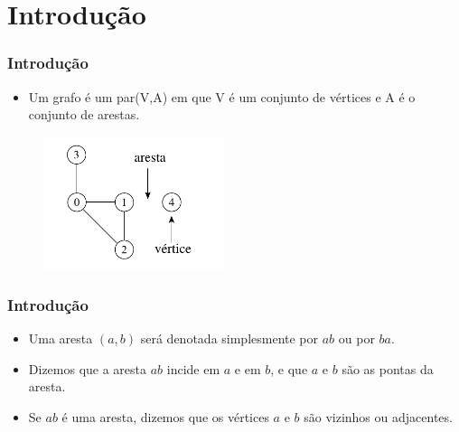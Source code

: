 \documentclass[aspectratio=169]{beamer}
\begin{document}
\section{Introdução} %

\begin{frame}
\frametitle{Introdução}
\begin{itemize}
\item Um grafo é um par(V,A) em que V é um conjunto de vértices e A é o conjunto de arestas.  
\end{itemize}
\begin{figure}[!h]
  \centering
  \includegraphics[width=150pt]{imagens/exemplo_grafo.png}
  \label{fig_exemplo_grafo1}
\end{figure}
\end{frame}


\begin{frame}
\frametitle{Introdução}
\begin{itemize}
\item Uma aresta $(a,b)$ será denotada simplesmente por $ab$ ou por $ba$.  
\item Dizemos que a aresta $ab$ incide em $a$ e em $b$, e que $a$ e $b$ são as pontas da aresta. 
\item Se $ab$ é uma aresta, dizemos que os vértices $a$ e $b$ são vizinhos ou adjacentes.
\end{itemize}
\end{frame}

\end{document}
